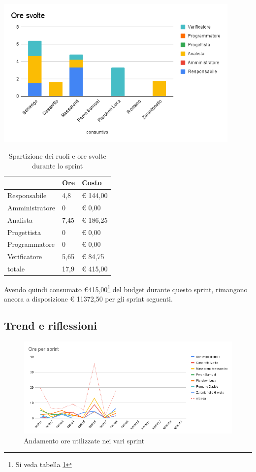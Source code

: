 \begin{center}
\includegraphics[width=12cm]{img/ore-svolte.png}
\end{center}

\begin{table}[ht]
    \begin{tabularx}{\linewidth}{X|l|l}
    \rowcolor{gray!30}& Ore & Costo \\
    \hline
    
    Responsabile & 4,8 & € 144,00 \\
    \rowcolor{gray!10}Amministratore & 0 & € 0,00 \\
    Analista & 7,45 & € 186,25 \\
    \rowcolor{gray!10}Progettista & 0 & € 0,00 \\
    Programmatore & 0 & € 0,00 \\
    \rowcolor{gray!10}Verificatore & 5,65 &€ 84,75 \\
    totale & 17,9 & € 415,00 \\
    \end{tabularx}
    \caption{\label{costi-ruolo}Spartizione dei ruoli e ore svolte durante lo sprint}
\end{table}

Avendo quindi consumato €415,00\footnote{Si veda tabella \ref{costi-ruolo}} del budget durante questo sprint, rimangono ancora a disposizione € 11372,50 per gli sprint seguenti.

\subsection{Trend e riflessioni}

\begin{figure}[H]
    \includegraphics[width=\linewidth]{img/andamento.png}
    \caption{Andamento ore utilizzate nei vari sprint}\label{img:andamento}
\end{figure}

